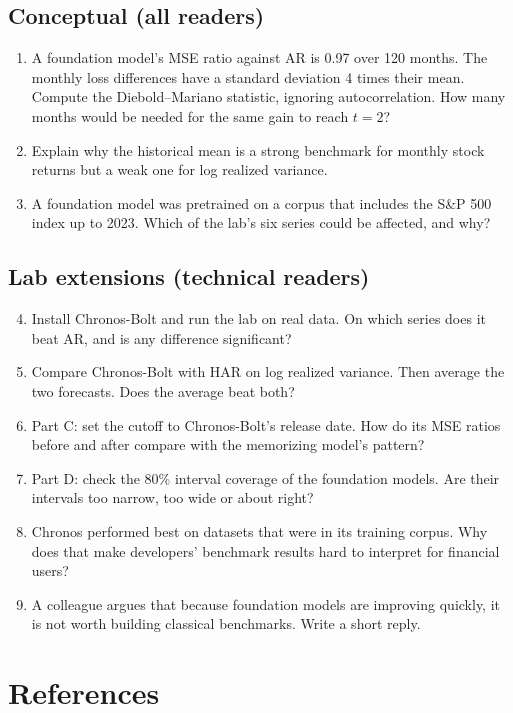 \subsection*{Conceptual (all readers)}

\begin{enumerate}
  \item A foundation model's MSE ratio against AR is 0.97 over 120 months. The monthly loss differences have a standard deviation 4 times their mean. Compute the Diebold--Mariano statistic, ignoring autocorrelation. How many months would be needed for the same gain to reach $t = 2$?
  \item Explain why the historical mean is a strong benchmark for monthly stock returns but a weak one for log realized variance.
  \item A foundation model was pretrained on a corpus that includes the S\&P 500 index up to 2023. Which of the lab's six series could be affected, and why?
\end{enumerate}

\subsection*{Lab extensions (technical readers)}

\begin{enumerate}
  \setcounter{enumi}{3}
  \item Install Chronos-Bolt and run the lab on real data. On which series does it beat AR, and is any difference significant?
  \item Compare Chronos-Bolt with HAR on log realized variance. Then average the two forecasts. Does the average beat both?
  \item Part C: set the cutoff to Chronos-Bolt's release date. How do its MSE ratios before and after compare with the memorizing model's pattern?
  \item Part D: check the 80\% interval coverage of the foundation models. Are their intervals too narrow, too wide or about right?
  \item Chronos performed best on datasets that were in its training corpus. Why does that make developers' benchmark results hard to interpret for financial users?
  \item A colleague argues that because foundation models are improving quickly, it is not worth building classical benchmarks. Write a short reply.
\end{enumerate}

\section*{References}


